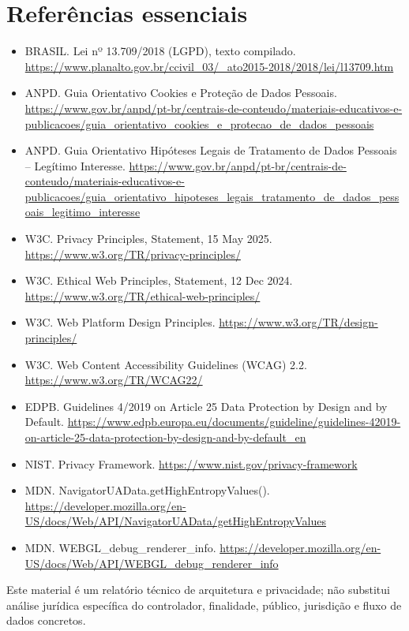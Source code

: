\documentclass[11pt,a4paper]{article}
\begin{document}
\section*{Referências essenciais}
\begin{itemize}
\item BRASIL. Lei nº 13.709/2018 (LGPD), texto compilado. \url{https://www.planalto.gov.br/ccivil_03/_ato2015-2018/2018/lei/l13709.htm}
\item ANPD. Guia Orientativo Cookies e Proteção de Dados Pessoais. \url{https://www.gov.br/anpd/pt-br/centrais-de-conteudo/materiais-educativos-e-publicacoes/guia_orientativo_cookies_e_protecao_de_dados_pessoais}
\item ANPD. Guia Orientativo Hipóteses Legais de Tratamento de Dados Pessoais -- Legítimo Interesse. \url{https://www.gov.br/anpd/pt-br/centrais-de-conteudo/materiais-educativos-e-publicacoes/guia_orientativo_hipoteses_legais_tratamento_de_dados_pessoais_legitimo_interesse}
\item W3C. Privacy Principles, Statement, 15 May 2025. \url{https://www.w3.org/TR/privacy-principles/}
\item W3C. Ethical Web Principles, Statement, 12 Dec 2024. \url{https://www.w3.org/TR/ethical-web-principles/}
\item W3C. Web Platform Design Principles. \url{https://www.w3.org/TR/design-principles/}
\item W3C. Web Content Accessibility Guidelines (WCAG) 2.2. \url{https://www.w3.org/TR/WCAG22/}
\item EDPB. Guidelines 4/2019 on Article 25 Data Protection by Design and by Default. \url{https://www.edpb.europa.eu/documents/guideline/guidelines-42019-on-article-25-data-protection-by-design-and-by-default_en}
\item NIST. Privacy Framework. \url{https://www.nist.gov/privacy-framework}
\item MDN. NavigatorUAData.getHighEntropyValues(). \url{https://developer.mozilla.org/en-US/docs/Web/API/NavigatorUAData/getHighEntropyValues}
\item MDN. WEBGL\_debug\_renderer\_info. \url{https://developer.mozilla.org/en-US/docs/Web/API/WEBGL_debug_renderer_info}
\end{itemize}

\vfill
\begin{center}\small Este material é um relatório técnico de arquitetura e privacidade; não substitui análise jurídica específica do controlador, finalidade, público, jurisdição e fluxo de dados concretos.\end{center}
\end{document}
